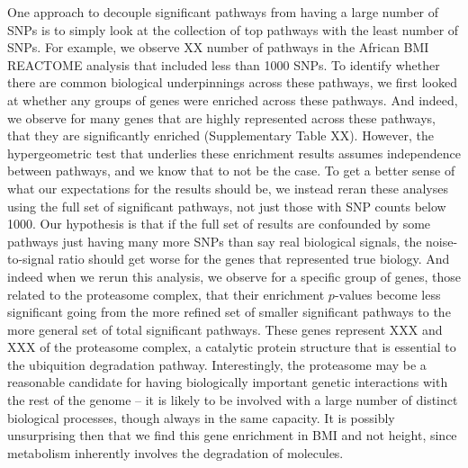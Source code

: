\documentclass[12pt, a4paper]{article}
\begin{document}
One approach to decouple significant pathways from having a large number of SNPs is to simply look at the collection of top pathways with the least number of SNPs. For example, we observe XX number of pathways in the African BMI REACTOME analysis that included less than 1000 SNPs. To identify whether there are common biological underpinnings across these pathways, we first looked at whether any groups of genes were enriched across these pathways. And indeed, we observe for many genes that are highly represented across these pathways, that they are significantly enriched (Supplementary Table XX). However, the hypergeometric test that underlies these enrichment results assumes independence between pathways, and we know that to not be the case. To get a better sense of what our expectations for the results should be, we instead reran these analyses using the full set of significant pathways, not just those with SNP counts below 1000. Our hypothesis is that if the full set of results are confounded by some pathways just having many more SNPs than say real biological signals, the noise-to-signal ratio should get worse for the genes that represented true biology. And indeed when we rerun this analysis, we observe for a specific group of genes, those related to the proteasome complex, that their enrichment $p$-values become less significant going from the more refined set of smaller significant pathways to the more general set of total significant pathways. These genes represent XXX and XXX of the proteasome complex, a catalytic protein structure that is essential to the ubiquition degradation pathway. Interestingly, the proteasome may be a reasonable candidate for having biologically important genetic interactions with the rest of the genome -- it is likely to be involved with a large number of distinct biological processes, though always in the same capacity. It is possibly unsurprising then that we find this gene enrichment in BMI and not height, since metabolism inherently involves the degradation of molecules. 

\end{document}
